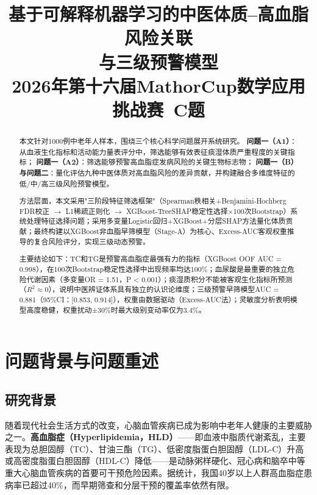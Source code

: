 \documentclass[12pt,a4paper]{ctexart}
\title{
  \textbf{\Large 基于可解释机器学习的中医体质--高血脂风险关联\\与三级预警模型}\\[0.5em]
  \large 2026年第十六届MathorCup数学应用挑战赛\ C题
}
\author{}
\date{}
\begin{document}
\maketitle
\thispagestyle{fancy}

\begin{abstract}
\noindent
本文针对1000例中老年人样本，围绕三个核心科学问题展开系统研究。
\textbf{问题一（A1）}：从血液生化指标和活动能力量表评分中，筛选能够有效表征痰湿体质严重程度的关键指标；
\textbf{问题一（A2）}：筛选能够预警高血脂症发病风险的关键生物标志物；
\textbf{问题一（B）与问题二}：量化评估九种中医体质对高血脂风险的差异贡献，并构建融合多维度特征的低/中/高三级风险预警模型。

方法层面，本文采用"三阶段特征筛选框架"（Spearman秩相关+Benjamini-Hochberg FDR校正 $\to$ L1稀疏正则化 $\to$ XGBoost-TreeSHAP稳定性选择$\times$100次Bootstrap）系统处理特征选择问题；采用多变量Logistic回归+XGBoost+分层SHAP方法量化体质贡献；最终构建以XGBoost非血脂早筛模型（Stage-A）为核心、Excess-AUC客观权重推导的复合风险评分，实现三级动态预警。

主要结论如下：TC和TG是预警高血脂症最强有力的指标（XGBoost OOF AUC = 0.998），在100次Bootstrap稳定性选择中出现频率均达100\%；血尿酸是最重要的独立危险代谢因素（多变量OR = 1.51，P < 0.001）；痰湿质积分不能被客观生化指标所预测（$R^2 \approx 0$），说明中医辨证体系具有独立的认识论维度；三级预警早筛模型AUC = 0.881（95\%CI：[0.853, 0.914]），权重由数据驱动（Excess-AUC法）；灵敏度分析表明模型高度稳健，权重扰动±30\%时最大级别变动率仅为3.4\%。
\end{abstract}

\tableofcontents
\newpage

\section{问题背景与问题重述}

\subsection{研究背景}

随着现代社会生活方式的改变，心脑血管疾病已成为影响中老年人健康的主要威胁之一。\textbf{高血脂症（Hyperlipidemia，HLD）}——即血液中脂质代谢紊乱，主要表现为总胆固醇（TC）、甘油三酯（TG）、低密度脂蛋白胆固醇（LDL-C）升高或高密度脂蛋白胆固醇（HDL-C）降低——是动脉粥样硬化、冠心病和脑卒中等重大心脑血管疾病的首要可干预危险因素。据统计，我国40岁以上人群高血脂症患病率已超过40\%，而早期筛查和分层干预的覆盖率依然有限。
\end{document}
